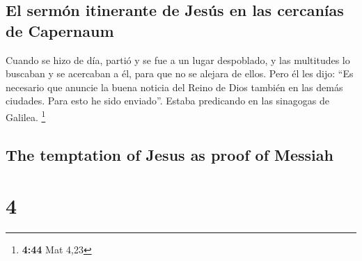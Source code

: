 \begin{paracol}{2}
\hypertarget{el-sermuxf3n-itinerante-de-jesuxfas-en-las-cercanuxedas-de-capernaum}{%
\subsection{El sermón itinerante de Jesús en las cercanías de
Capernaum}\label{el-sermuxf3n-itinerante-de-jesuxfas-en-las-cercanuxedas-de-capernaum}}

 Cuando se hizo de día, partió y se fue a un lugar
despoblado, y las multitudes lo buscaban y se acercaban a él, para que
no se alejara de ellos.  Pero él les dijo: ``Es necesario
que anuncie la buena noticia del Reino de Dios también en las demás
ciudades. Para esto he sido enviado''.  Estaba predicando
en las sinagogas de Galilea. \footnote{\textbf{4:44} Mat 4,23}

\switchcolumn
\begin{otherlanguage}{english}

\hypertarget{the-temptation-of-jesus-as-proof-of-messiah}{%
\subsection{The temptation of Jesus as proof of
Messiah}\label{the-temptation-of-jesus-as-proof-of-messiah}}

\hypertarget{section-7}{%
\section{4}\label{section-7}}


\end{otherlanguage}
\end{paracol}
